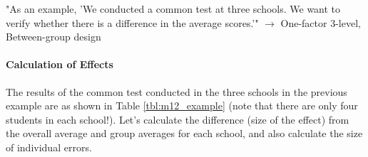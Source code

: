 \documentclass{ltjbook}
\begin{document}
"As an example, 'We conducted a common test at three schools. We want to verify whether there is a difference in the average scores.'" $\to$ One-factor 3-level, Between-group design


\paragraph{Calculation of Effects} The results of the common test conducted in the three schools in the previous example are as shown in Table \ref{tbl:m12_example} (note that there are only four students in each school!). Let's calculate the difference (size of the effect) from the overall average and group averages for each school, and also calculate the size of individual errors.

\end{document}
